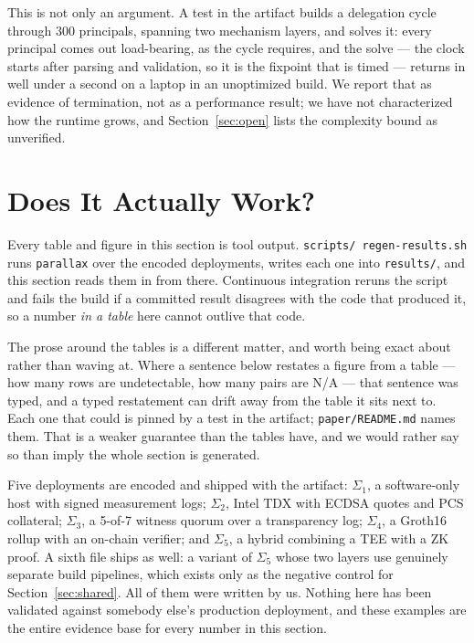 \documentclass[11pt]{article}
\newcommand{\parallax}{\texttt{parallax}}
\begin{document}
This is not only an argument. A test in the artifact builds a delegation cycle
through 300 principals, spanning two mechanism layers, and solves it: every
principal comes out load-bearing, as the cycle requires, and the solve --- the
clock starts after parsing and validation, so it is the fixpoint that is
timed --- returns in well under a second on a laptop in an unoptimized build.
We report that as evidence of termination, not as a performance
result; we have not characterized how the runtime grows, and
Section~\ref{sec:open} lists the complexity bound as unverified.

\section{Does It Actually Work?}
\label{sec:eval}

Every table and figure in this section is tool output. \texttt{scripts/%
\allowbreak regen-results.sh} runs \parallax{} over the encoded deployments,
writes each one into \texttt{results/}, and this section reads them in from
there. Continuous integration reruns the script and fails the build if a
committed result disagrees with the code that produced it, so a number
\emph{in a table} here cannot outlive that code.

The prose around the tables is a different matter, and worth being exact
about rather than waving at. Where a sentence below restates a figure from a
table --- how many rows are undetectable, how many pairs are N/A --- that
sentence was typed, and a typed restatement can drift away from the table it
sits next to. Each one that could is pinned by a test in the artifact;
\texttt{paper/README.md} names them. That is a weaker guarantee than the
tables have, and we would rather say so than imply the whole section is
generated.

Five deployments are encoded and shipped with the artifact:
$\Sigma_1$, a software-only host with signed measurement logs; $\Sigma_2$,
Intel TDX with ECDSA quotes and PCS collateral; $\Sigma_3$, a 5-of-7 witness
quorum over a transparency log; $\Sigma_4$, a Groth16 rollup with an on-chain
verifier; and $\Sigma_5$, a hybrid combining a TEE with a ZK proof. A sixth
file ships as well: a variant of $\Sigma_5$ whose two layers use genuinely
separate build pipelines, which exists only as the negative control for
Section~\ref{sec:shared}. All of them were written by us. Nothing here has
been validated against somebody else's production deployment, and these
examples are the entire evidence base for every number in this section.
\end{document}
